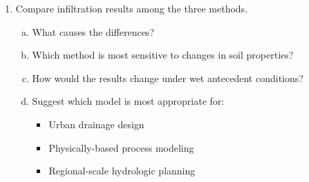 \documentclass[12pt]{article}
\begin{document}
\begin{enumerate}
    \item Compare infiltration results among the three methods.
    \begin{enumerate}[a)]
        \item What causes the differences?
        \item Which method is most sensitive to changes in soil properties?
        \item How would the results change under wet antecedent conditions?
        \item Suggest which model is most appropriate for:
            \begin{itemize}
                \item Urban drainage design
                \item Physically-based process modeling
                \item Regional-scale hydrologic planning
            \end{itemize}
    \end{enumerate}
    
\end{enumerate}
\end{document}

